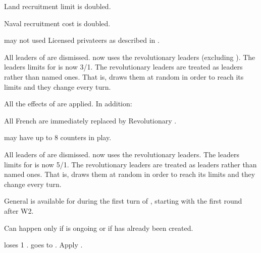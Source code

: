 \begin{digressions}
  \aparag Land recruitment limit is doubled.

  \aparag Naval recruitment cost is doubled.

  \aparag \FRA may not used Licensed privateers as described in
  .

  \bparag All leaders of \FRA are dismissed. \FRA now uses the revolutionary
  leaders (excluding \leaderBonaparte).
  \bparag The leaders limits for \FRA is now 3\LeaderG/1\LeaderA.
  \bparag The revolutionary leaders are treated as \anonyme leaders rather
  than named ones. That is, \FRA draws them at random in order to reach
  its limits and they change every turn.

  All the effects of  are applied. In
  addition:

  \phdipl
  \aparag All French \ARMY are immediately replaced by Revolutionary \ARMY.

  \aparag \FRA may have up to 8 \ARMY counters in play.

  \bparag All leaders of \FRA are dismissed. \FRA now uses the revolutionary
  leaders.
  \bparag The leaders limits for \FRA is now 5\LeaderG/1\LeaderA.
  \bparag The revolutionary leaders are treated as \anonyme leaders rather
  than named ones. That is, \FRA draws them at random in order to reach
  its limits and they change every turn.

  \aparag General  is available for \FRA during the
  first turn of \monarqueTerror, starting with the first round after
  W2. %
\end{digressions}



\condition{}
\aparag Can happen only if  is ongoing or if
\paysusa has already been created.

\phevnt
\aparag \FRA loses 1 \STAB.
\aparag \FRA goes to \monarqueTerror. Apply
.

